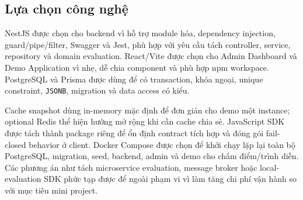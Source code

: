 \subsection{Lựa chọn công nghệ}

NestJS được chọn cho backend vì hỗ trợ module hóa, dependency injection, guard/pipe/filter, Swagger và Jest, phù hợp với yêu cầu tách controller, service, repository và domain evaluation. React/Vite được chọn cho Admin Dashboard và Demo Application vì nhẹ, dễ chia component và phù hợp npm workspace. PostgreSQL và Prisma được dùng để có transaction, khóa ngoại, unique constraint, \texttt{JSONB}, migration và data access có kiểu.

Cache snapshot dùng in-memory mặc định để đơn giản cho demo một instance; optional Redis thể hiện hướng mở rộng khi cần cache chia sẻ. JavaScript SDK được tách thành package riêng để ổn định contract tích hợp và đóng gói fail-closed behavior ở client. Docker Compose được chọn để khởi chạy lặp lại toàn bộ PostgreSQL, migration, seed, backend, admin và demo cho chấm điểm/trình diễn. Các phương án như tách microservice evaluation, message broker hoặc local-evaluation SDK phức tạp được để ngoài phạm vi vì làm tăng chi phí vận hành so với mục tiêu mini project.
